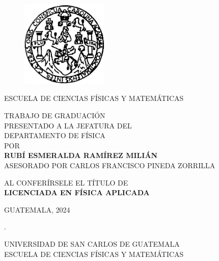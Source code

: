 \begin{figure}[h]
  \begin{center}
    \includegraphics[width=4.15cm]{../Images/escudo-eps-converted-to.jpg}\\
  \end{center}
\end{figure}

\begin{center}
\vspace{-0.5mm}ESCUELA DE CIENCIAS FÍSICAS Y MATEMÁTICAS

\vfill

\vfill

TRABAJO DE GRADUACIÓN \\[3pt] PRESENTADO A LA JEFATURA DEL \\[3pt]
DEPARTAMENTO DE FÍSICA\\[3pt] POR \\[1.15cm]
\textbf{\MakeUppercase{Rubí Esmeralda Ramírez Milián}} \\[6pt]
ASESORADO POR {\MakeUppercase{Carlos Francisco Pineda Zorrilla}} 

\vfill
AL CONFERÍRSELE EL TÍTULO DE \\[6pt]
\textbf{LICENCIADA EN FÍSICA APLICADA}

\vfill

GUATEMALA, {\MakeUppercase{ 2024}}

\end{center}


\newpage
\textcolor[rgb]{1,1,1}{.} 

\thispagestyle{empty}


\newpage

\thispagestyle{empty}

\begin{center}
UNIVERSIDAD DE SAN CARLOS DE GUATEMALA\\[6pt] ESCUELA DE CIENCIAS FÍSICAS Y MATEMÁTICAS
\end{center}

